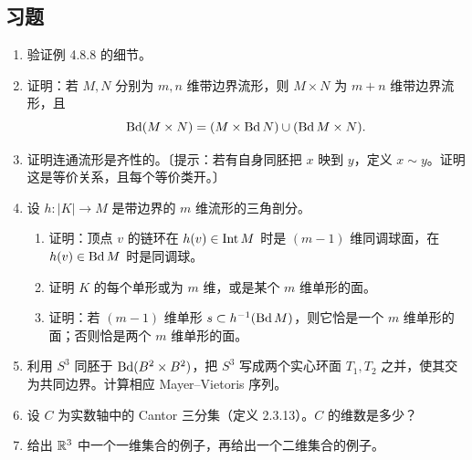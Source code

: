 \subsection*{习题}
\begin{enumerate}
\item 验证例 4.8.8 的细节。
\item 证明：若 $M,N$ 分别为 $m,n$ 维带边界流形，则 $M\times N$ 为 $m+n$ 维带边界流形，且
\[
\operatorname{Bd}(M\times N)=(M\times\operatorname{Bd} N)\cup(\operatorname{Bd} M\times N).
\]
\item 证明连通流形是齐性的。〔提示：若有自身同胚把 $x$ 映到 $y$，定义 $x\sim y$。证明这是等价关系，且每个等价类开。〕
\item 设 $h:|K|\to M$ 是带边界的 $m$ 维流形的三角剖分。
\begin{enumerate}[label=(\alph*)]
\item 证明：顶点 $v$ 的链环在 $h(v)\in\operatorname{Int} M$ 时是 $(m-1)$ 维同调球面，在 $h(v)\in\operatorname{Bd} M$ 时是同调球。
\item 证明 $K$ 的每个单形或为 $m$ 维，或是某个 $m$ 维单形的面。
\item 证明：若 $(m-1)$ 维单形 $s\subset h^{-1}(\operatorname{Bd} M)$，则它恰是一个 $m$ 维单形的面；否则恰是两个 $m$ 维单形的面。
\end{enumerate}
\item 利用 $S^3$ 同胚于 $\operatorname{Bd}(B^2\times B^2)$，把 $S^3$ 写成两个实心环面 $T_1,T_2$ 之并，使其交为共同边界。计算相应 Mayer--Vietoris 序列。
\item 设 $C$ 为实数轴中的 Cantor 三分集（定义 2.3.13）。$C$ 的维数是多少？
\item 给出 $\mathbb{R}^3$ 中一个一维集合的例子，再给出一个二维集合的例子。
\end{enumerate}
